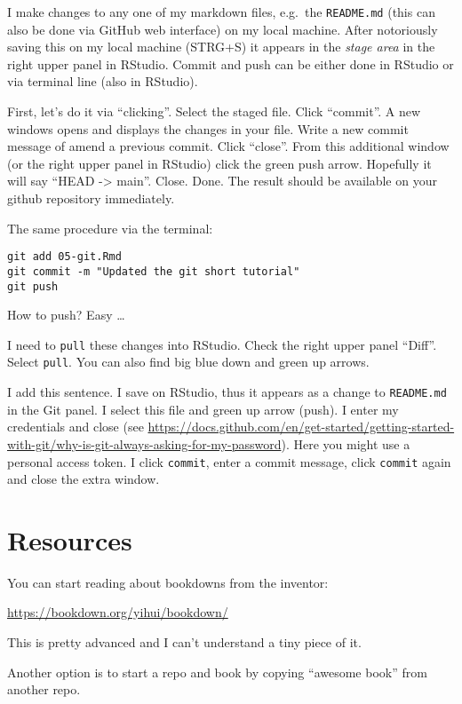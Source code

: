 \documentclass[
]{book}
\begin{document}
I make changes to any one of my markdown files, e.g.~the \texttt{README.md} (this can also be done via GitHub web interface) on my local machine. After notoriously saving this on my local machine (STRG+S) it appears in the \emph{stage area} in the right upper panel in RStudio. Commit and push can be either done in RStudio or via terminal line (also in RStudio).

First, let's do it via ``clicking''. Select the staged file. Click ``commit''. A new windows opens and displays the changes in your file. Write a new commit message of amend a previous commit. Click ``close''. From this additional window (or the right upper panel in RStudio) click the green push arrow. Hopefully it will say ``HEAD -\textgreater{} main''. Close. Done. The result should be available on your github repository immediately.

The same procedure via the terminal:

\begin{verbatim}
git add 05-git.Rmd
git commit -m "Updated the git short tutorial"
git push 
\end{verbatim}

How to push? Easy \ldots{}

I need to \texttt{pull} these changes into RStudio. Check the right upper panel ``Diff''. Select \texttt{pull}. You can also find big blue down and green up arrows.

I add this sentence. I save on RStudio, thus it appears as a change to \texttt{README.md} in the Git panel. I select this file and green up arrow (push). I enter my credentials and close (see \url{https://docs.github.com/en/get-started/getting-started-with-git/why-is-git-always-asking-for-my-password}). Here you might use a personal access token. I click \texttt{commit}, enter a commit message, click \texttt{commit} again and close the extra window.

\hypertarget{resources}{%
\section{Resources}\label{resources}}

You can start reading about bookdowns from the inventor:

\url{https://bookdown.org/yihui/bookdown/}

This is pretty advanced and I can't understand a tiny piece of it.

Another option is to start a repo and book by copying ``awesome book'' from another repo.
\end{document}
